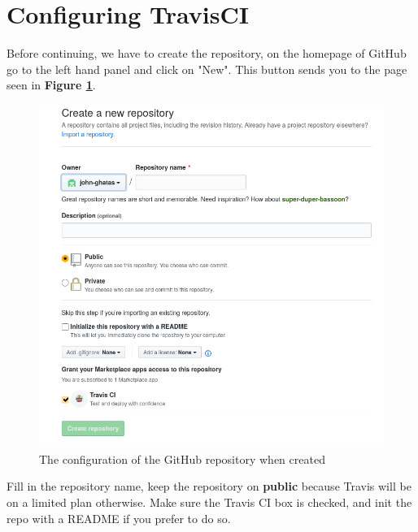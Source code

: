 \documentclass{paper}
\begin{document}
    \section{Configuring TravisCI}
    {Before continuing, we have to create the repository, on the homepage of GitHub go to the left hand panel and click on "New". 
    This button sends you to the page seen in \textbf{Figure \ref{fig:github}}.
    \begin{figure}[!h]
        \centering
        \includegraphics[scale=1.4, pagebox=artbox]{Images/github.png}
        \caption{The configuration of the GitHub repository when created}
        \label{fig:github}
    \end{figure}        
    \newline
    Fill in the repository name, keep the repository on \textbf{public} because Travis will be on a limited plan otherwise. 
    Make sure the Travis CI box is checked, and init the repo with a README if you prefer to do so. 
    \newpage
    }

\end{document}
